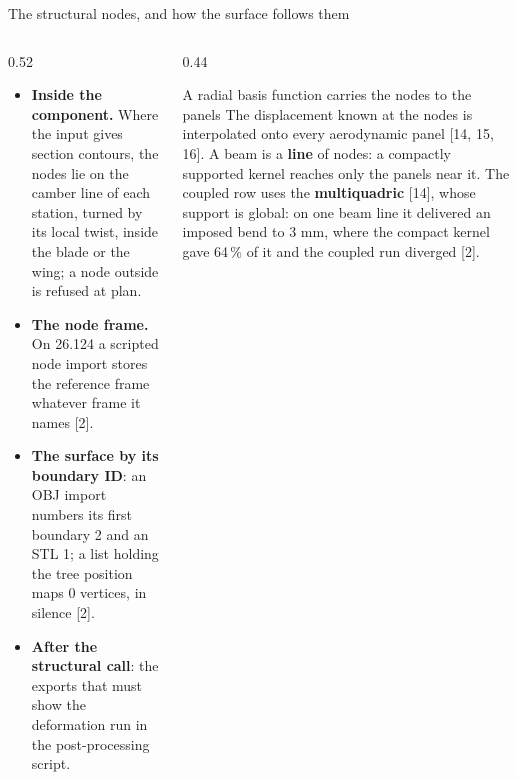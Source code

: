 \begin{frame}{The structural nodes, and how the surface follows them}
\begin{columns}[T]
\begin{column}{0.52\textwidth}
\begin{itemize}\footnotesize
  \item \textbf{Inside the component.} Where the input gives section
        contours, the nodes lie on the camber line of each station, turned by
        its local twist, inside the blade or the wing; a node outside is
        refused at plan.
  \item \textbf{The node frame.} On 26.124 a scripted node import stores the
        reference frame whatever frame it names [2].
  \item \textbf{The surface by its boundary ID}: an OBJ import numbers its
        first boundary 2 and an STL 1; a list holding the tree position maps
        0 vertices, in silence [2].
  \item \textbf{After the structural call}: the exports that must show the
        deformation run in the post-processing script.
\end{itemize}
\end{column}
\begin{column}{0.44\textwidth}
\begin{block}{A radial basis function carries the nodes to the panels}
\footnotesize The displacement known at the nodes is interpolated onto every
aerodynamic panel [14, 15, 16]. A beam is a \textbf{line} of nodes: a
compactly supported kernel reaches only the panels near it. The coupled row
uses the \textbf{multiquadric} [14], whose support is global: on one beam line
it delivered an imposed bend to 3 mm, where the compact kernel gave 64\,\% of
it and the coupled run diverged [2].
\end{block}
\end{column}
\end{columns}
\end{frame}

